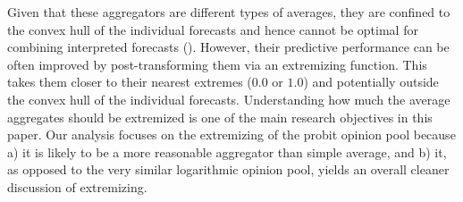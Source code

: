 \documentclass[11pt]{article}
\theoremstyle{definition}
\theoremstyle{definition}
\begin{document}
Given that these aggregators are different types of averages, they are confined to the convex hull of the individual forecasts and hence cannot be optimal for combining interpreted forecasts (\citet{parunak2013characterizing}). However, their predictive performance can be often improved by post-transforming them via an extremizing function. This takes them closer to their nearest extremes ($0.0$ or $1.0$) and potentially  outside the convex hull of the individual forecasts. Understanding how much the average aggregates should be extremized is one of the main research objectives in this paper. Our analysis focuses on the extremizing of the probit opinion pool because a) it is likely to be a more reasonable aggregator than simple average, and b) it, as opposed to the very similar logarithmic opinion pool, yields an overall cleaner discussion  of extremizing. 



\end{document}
